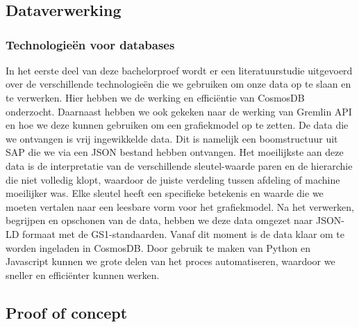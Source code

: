
\chapter{}%
\label{ch:methodologie}
\section{Dataverwerking}
\subsection{Technologieën voor databases}
In het eerste deel van deze bachelorproef wordt er een literatuurstudie uitgevoerd over de verschillende technologieën die we gebruiken om onze data op te slaan en te verwerken.
Hier hebben we de werking en efficiëntie van CosmosDB onderzocht. Daarnaast hebben we ook gekeken naar de werking van Gremlin API en hoe we deze kunnen gebruiken om een grafiekmodel op te zetten.
De data die we ontvangen is vrij ingewikkelde data. Dit is namelijk een boomstructuur uit SAP die we via een JSON bestand hebben ontvangen.
Het moeilijkste aan deze data is de interpretatie van de verschillende sleutel-waarde paren en de hierarchie die niet volledig klopt, waardoor de juiste verdeling tussen afdeling of machine moeilijker was. 
Elke sleutel heeft een specifieke betekenis en waarde die we moeten vertalen naar een leesbare vorm voor het grafiekmodel.
Na het verwerken, begrijpen en opschonen van de data, hebben we deze data omgezet naar JSON-LD formaat met de GS1-standaarden.
Vanaf dit moment is de data klaar om te worden ingeladen in CosmosDB.\@
Door gebruik te maken van Python en Javascript kunnen we grote delen van het proces automatiseren, waardoor we sneller en efficiënter kunnen werken.

\section{Proof of concept}
